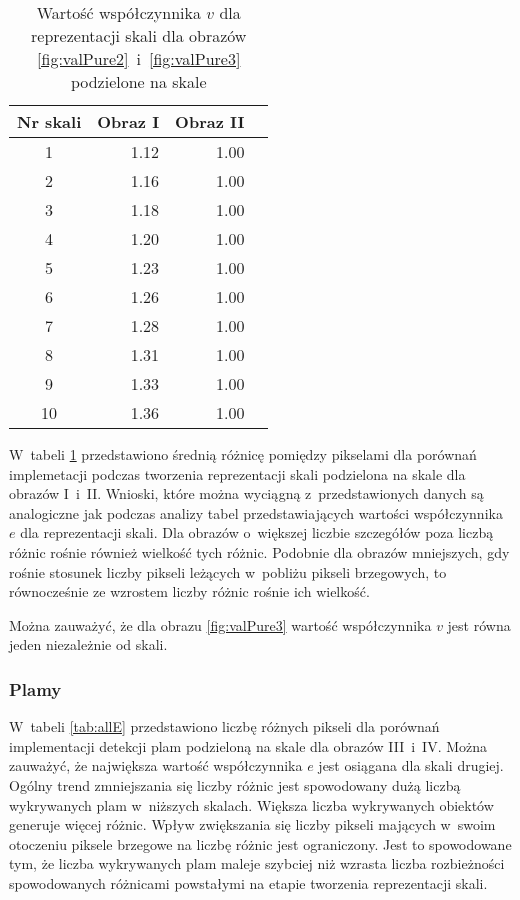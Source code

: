 \begin{center}
\begin{table}
\centering
\caption{Wartość współczynnika $ v $ dla reprezentacji skali dla obrazów \ref{fig:valPure2}~i~\ref{fig:valPure3} podzielone na skale}
\label{tab:allV}
\begin{tabular}{|c|r|r|r|}
\hline
Nr skali & Obraz I  &  Obraz II\\ \hline
1        & 1.12     & 1.00\\ \hline
2        & 1.16     & 1.00\\ \hline
3        & 1.18     & 1.00\\ \hline
4        & 1.20     & 1.00\\ \hline
5        & 1.23     & 1.00\\ \hline
6        & 1.26     & 1.00\\ \hline
7        & 1.28     & 1.00\\ \hline
8        & 1.31     & 1.00\\ \hline
9        & 1.33     & 1.00\\ \hline
10       & 1.36     & 1.00\\ \hline
\end{tabular}
\end{table}
\end{center}

W~tabeli \ref{tab:allV} przedstawiono średnią różnicę pomiędzy pikselami dla porównań implemetacji podczas tworzenia reprezentacji skali podzielona na skale dla obrazów I~i~II. Wnioski, które można wyciągną z~przedstawionych danych są analogiczne jak podczas analizy tabel przedstawiających wartości współczynnika $ e $ dla reprezentacji skali. Dla obrazów o~większej liczbie szczegółów poza liczbą różnic rośnie również wielkość tych różnic. Podobnie dla obrazów mniejszych, gdy rośnie stosunek liczby pikseli leżących w~pobliżu pikseli brzegowych, to równocześnie ze wzrostem liczby różnic rośnie ich wielkość.

Można zauważyć, że dla obrazu \ref{fig:valPure3} wartość współczynnika $ v $ jest równa jeden niezależnie od skali.

\subsubsection{Plamy}
\label{subsubsec:plamyTabele}

W~tabeli \ref{tab:allE} przedstawiono liczbę różnych pikseli dla porównań implementacji detekcji plam podzieloną na skale dla obrazów III~i~IV. Można zauważyć, że największa wartość współczynnika $ e $ jest osiągana dla skali drugiej. Ogólny trend zmniejszania się liczby różnic jest spowodowany dużą liczbą wykrywanych plam w~niższych skalach. Większa liczba wykrywanych obiektów generuje więcej różnic. Wpływ zwiększania się liczby pikseli mających w~swoim otoczeniu piksele brzegowe na liczbę różnic jest ograniczony. Jest to spowodowane tym, że liczba wykrywanych plam maleje szybciej niż wzrasta liczba rozbieżności spowodowanych różnicami powstałymi na etapie tworzenia reprezentacji skali.


